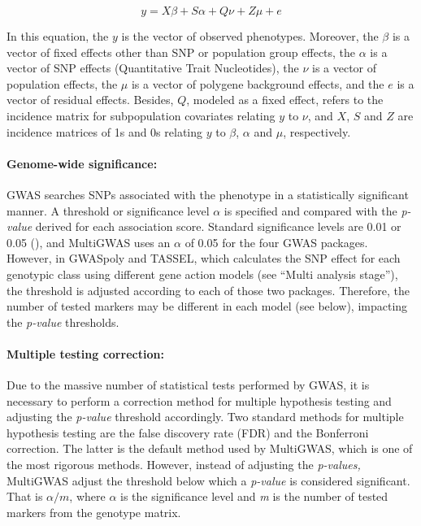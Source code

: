 \documentclass{article}
\begin{document}
\[
y=X\beta+S\alpha+Q\nu+Z\mu+e
\]

In this equation, the $y$ is the vector of observed phenotypes. Moreover, the $\beta$ is a vector of fixed effects other than SNP or population group effects, the $\alpha$ is a vector of SNP effects (Quantitative Trait Nucleotides), the $\nu$ is a vector of population effects, the $\mu$ is a vector of polygene background effects, and the $e$ is a vector of residual effects. Besides,  $Q$, modeled as a fixed effect, refers to the incidence matrix for subpopulation covariates relating $y$ to $\nu$, and $X$, $S$ and $Z$ are incidence matrices of 1s and 0s relating $y$ to $\beta$, $\alpha$ and $\mu$, respectively.


\paragraph{Genome-wide significance: }

GWAS searches SNPs associated with the phenotype in a statistically significant manner. A threshold or significance level $\alpha$ is specified and compared with the \emph{p-value} derived for each association score. Standard significance levels are 0.01 or 0.05 (\cite{Gumpinger2018,Rosyara2016}), and MultiGWAS uses an $\alpha$ of 0.05 for the four GWAS packages. However,  in GWASpoly and TASSEL, which calculates the SNP effect for each genotypic class using different gene action models (see ``Multi analysis stage''), the threshold is adjusted according to each of those two packages. Therefore, the number of tested markers\emph{ }may be different in each model (see below), impacting the \emph{p-value} thresholds.

\paragraph{Multiple testing correction:}

Due to the massive number of statistical tests performed by GWAS, it is necessary to perform a correction method for multiple hypothesis testing and adjusting the \emph{p-value} threshold accordingly. Two standard methods for multiple hypothesis testing are the false discovery rate (FDR) and the Bonferroni correction. The latter is the default method used by MultiGWAS, which is one of the most rigorous methods. However, instead of adjusting the \emph{p-values,} MultiGWAS adjust the threshold below which a \emph{p-value} is considered significant. That is $\alpha/m$, where $\alpha$ is the significance level and \emph{m }is the number of tested markers from the genotype matrix. 
\end{document}
